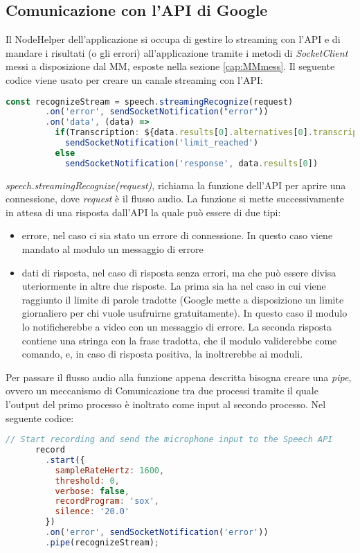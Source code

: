 \subsection{Comunicazione con l'API di Google}\label{cap:api}
Il NodeHelper dell'applicazione si occupa di gestire lo streaming con l'API e
di mandare i risultati (o gli errori) all'applicazione tramite i metodi di \emph{SocketClient} messi
a disposizione dal MM, esposte nella sezione \ref{cap:MMmess}.
Il seguente codice viene usato per creare un canale streaming con l'API:
\begin{lstlisting}[language=Javascript, caption={Codice per l'inoltro dell'audio al Servizio Google}, captionpos=b]
      const recognizeStream = speech.streamingRecognize(request)
        .on('error', sendSocketNotification("error"))
        .on('data', (data) =>
          if(Transcription: ${data.results[0].alternatives[0].transcript})
            sendSocketNotification('limit_reached')
          else
            sendSocketNotification('response', data.results[0])
\end{lstlisting}
\emph{speech.streamingRecognize(request)}, richiama la funzione dell'API per aprire una connessione, dove \emph{request} \`e
il flusso audio.
La funzione si mette successivamente in attesa di una risposta dall'API la quale pu\`o essere di due tipi:
\begin{itemize}
\item errore, nel caso ci sia stato un errore di connessione. In questo caso viene mandato al modulo un messaggio di errore
\item dati di risposta, nel caso di risposta senza errori, ma che pu\`o essere divisa uteriormente in altre due risposte. La prima sia ha nel caso in cui
viene raggiunto il limite di parole tradotte (Google mette a disposizione un limite giornaliero per chi vuole usufruirne gratuitamente). In questo caso
il modulo lo notificherebbe a video con un messaggio di errore. La seconda risposta contiene una stringa con la frase tradotta,
che il modulo validerebbe come comando,
e, in caso di risposta positiva, la inoltrerebbe ai moduli.\\[1\baselineskip]
\end{itemize}
Per passare il flusso audio alla funzione appena descritta bisogna creare una \emph{pipe}, ovvero un meccanismo di Comunicazione
tra due processi tramite il quale l'output del primo processo \`e inoltrato come input al secondo processo.
Nel seguente codice:
\begin{lstlisting}[language=Javascript]
      // Start recording and send the microphone input to the Speech API
      record
        .start({
          sampleRateHertz: 1600,
          threshold: 0,
          verbose: false,
          recordProgram: 'sox',
          silence: '20.0'
        })
        .on('error', sendSocketNotification('error'))
        .pipe(recognizeStream);
\end{lstlisting}
